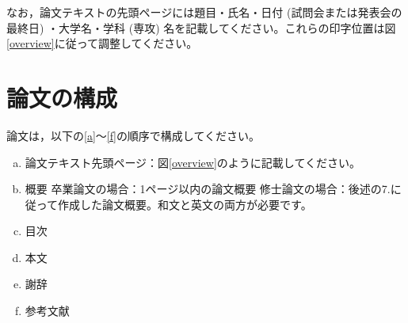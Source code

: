 \documentclass{kupaper}
\begin{document}
なお，論文テキストの先頭ページには題目・氏名・日付 (試問会または発表会の最終日) ・大学名・学科 (専攻) 名を記載してください。これらの印字位置は図\ref{overview}に従って調整してください。


\chapter{論文の構成} \label{論文の構成}
論文は，以下の\ref{a}～\ref{f}の順序で構成してください。



\begin{enumerate}[a.]
	\item 論文テキスト先頭ページ：図\ref{overview}のように記載してください。\label{a}
	\item 概要\label{b}
	      卒業論文の場合：1ページ以内の論文概要
	      修士論文の場合：後述の7.に従って作成した論文概要。和文と英文の両方が必要です。
	\item 目次\label{c}
	\item 本文\label{d}
	\item 謝辞\label{e}
	\item 参考文献\label{f}
\end{enumerate}
\end{document}
